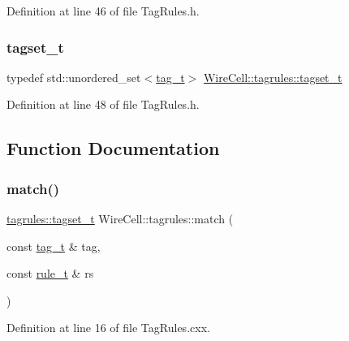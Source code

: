 Definition at line 46 of file Tag\+Rules.\+h.

\mbox{\label{namespace_wire_cell_1_1tagrules_a80263165e3d13e49e317c045829f76cb}} 
\subsubsection{\texorpdfstring{tagset\+\_\+t}{tagset\_t}}
{\footnotesize\ttfamily typedef std\+::unordered\+\_\+set$<$\hyperlink{namespace_wire_cell_1_1tagrules_ae74af6e8edaf0f64b70f6df4e0b66cdc}{tag\+\_\+t}$>$ \hyperlink{namespace_wire_cell_1_1tagrules_a80263165e3d13e49e317c045829f76cb}{Wire\+Cell\+::tagrules\+::tagset\+\_\+t}}



Definition at line 48 of file Tag\+Rules.\+h.



\subsection{Function Documentation}
\mbox{\label{namespace_wire_cell_1_1tagrules_aed120ffc74c8d10ff4498490ec742f87}} 
\subsubsection{\texorpdfstring{match()}{match()}\hspace{0.1cm}{\footnotesize\ttfamily [1/2]}}
{\footnotesize\ttfamily \hyperlink{namespace_wire_cell_1_1tagrules_a80263165e3d13e49e317c045829f76cb}{tagrules\+::tagset\+\_\+t} Wire\+Cell\+::tagrules\+::match (\begin{DoxyParamCaption}\item[{const \hyperlink{namespace_wire_cell_1_1tagrules_ae74af6e8edaf0f64b70f6df4e0b66cdc}{tag\+\_\+t} \&}]{tag,  }\item[{const \hyperlink{namespace_wire_cell_1_1tagrules_abc013e08147e32e1661654bb3e768151}{rule\+\_\+t} \&}]{rs }\end{DoxyParamCaption})}



Definition at line 16 of file Tag\+Rules.\+cxx.


